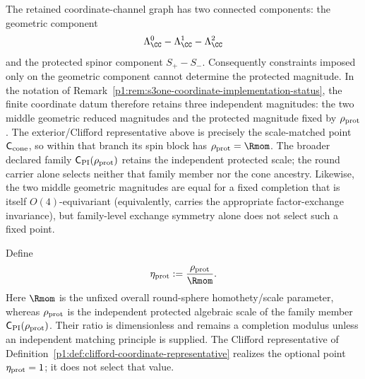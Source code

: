 \documentclass[11pt]{article}
\begin{document}
\begin{remark}
\label{p1:rem:clifford-representative-scope}
\leavevmode\par
The retained coordinate-channel graph has two connected components: the
geometric component
\[
 \Lambda^0_\CC-\Lambda^1_\CC-\Lambda^2_\CC
\]
and the protected spinor component \(S_+-S_-\).  Consequently constraints imposed only on the
geometric component cannot determine the protected magnitude.  In the
notation of Remark~\ref{p1:rem:s3one-coordinate-implementation-status}, the
finite coordinate datum therefore retains three independent magnitudes: the
two middle geometric reduced magnitudes and the protected magnitude fixed by
\(\rho_{\rm prot}\).  The exterior/Clifford representative above is precisely
the scale-matched point \(\mathsf C_{\rm cone}\), so within that branch its
spin block has \(\rho_{\rm prot}=\Rmom\).  The broader declared family
\(\mathsf C_{\rm PI}(\rho_{\rm prot})\) retains the independent protected
scale; the round carrier alone selects neither that family member nor the cone
ancestry.
Likewise, the two middle geometric magnitudes are equal for a fixed
completion that is itself \(O(4)\)-equivariant (equivalently, carries the
appropriate factor-exchange invariance), but family-level exchange symmetry
alone does not select such a fixed point.
\end{remark}

\begin{definition}
\label{p1:def:protected-parent-scale-ratio}
Define
\[
 \eta_{\rm prot}:=\frac{\rho_{\rm prot}}{\Rmom}.
\]
Here \(\Rmom\) is the unfixed overall round-sphere homothety/scale parameter,
whereas \(\rho_{\rm prot}\) is the independent protected algebraic scale of
the family member \(\mathsf C_{\rm PI}(\rho_{\rm prot})\).  Their ratio is dimensionless and remains a
completion modulus unless an independent matching principle is supplied.  The
Clifford representative of
Definition~\ref{p1:def:clifford-coordinate-representative} realizes the
optional point \(\eta_{\rm prot}=1\); it does not select that value.
\end{definition}
\end{document}
